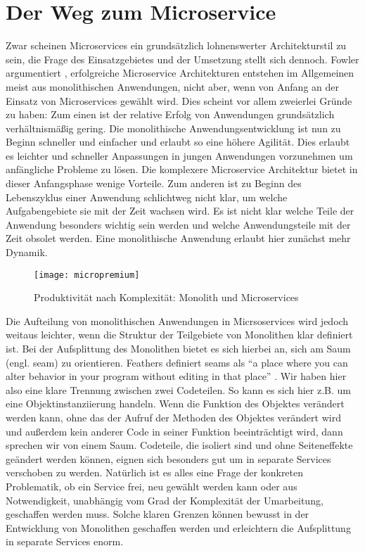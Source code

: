 \section{Der Weg zum Microservice}
Zwar scheinen Microservices ein grundsätzlich lohnenswerter Architekturstil zu sein, die Frage des Einsatzgebietes und der Umsetzung stellt sich dennoch. Fowler argumentiert \cite[][]{fowler:monolithfirst}, erfolgreiche Microservice Architekturen entstehen im Allgemeinen meist aus monolithischen Anwendungen, nicht aber, wenn von Anfang an der Einsatz von Microservices gewählt wird. Dies scheint vor allem zweierlei Gründe zu haben: Zum einen ist der relative Erfolg von Anwendungen grundsätzlich verhältnismäßig gering. Die monolithische Anwendungsentwicklung ist nun zu Beginn schneller und einfacher und erlaubt so eine höhere Agilität. Dies erlaubt es leichter und schneller Anpassungen in jungen Anwendungen vorzunehmen um anfängliche Probleme zu lösen. Die komplexere Microservice Architektur bietet in dieser Anfangsphase wenige Vorteile. Zum anderen ist zu Beginn des Lebenszyklus einer Anwendung schlichtweg nicht klar, um welche Aufgabengebiete sie mit der Zeit wachsen wird. Es ist nicht klar welche Teile der Anwendung besonders wichtig sein werden und welche Anwendungsteile mit der Zeit obsolet werden. Eine monolithische Anwendung erlaubt hier zunächst mehr Dynamik.

\begin{figure}[!ht]
    \caption{Produktivität nach Komplexität: Monolith und Microservices \cite{fowler:micropremium}}
    \centering
    \label{fig:micropremium}
    \texttt{[image: micropremium]}
\end{figure}

Die Aufteilung von monolithischen Anwendungen in Micrsoservices wird jedoch weitaus leichter, wenn die Struktur der Teilgebiete von Monolithen klar definiert ist. Bei der Aufsplittung des Monolithen bietet es sich hierbei an, sich am Saum (engl. seam) zu orientieren. Feathers definiert seams als \enquote{a place where you can alter behavior in your program without editing in that place} \cite[][Seite 29]{feathers2004working}. Wir haben hier also eine klare Trennung zwischen zwei Codeteilen. So kann es sich hier z.B. um eine Objektinstanziierung handeln. Wenn die Funktion des Objektes verändert werden kann, ohne das der Aufruf der Methoden des Objektes verändert wird und außerdem kein anderer Code in seiner Funktion beeinträchtigt wird, dann sprechen wir von einem Saum. Codeteile, die isoliert sind und ohne Seiteneffekte geändert werden können, eignen sich besonders gut um in separate Services verschoben zu werden. Natürlich ist es alles eine Frage der konkreten Problematik, ob ein Service frei, neu gewählt werden kann oder aus Notwendigkeit, unabhängig vom Grad der Komplexität der Umarbeitung, geschaffen werden muss. Solche klaren Grenzen können bewusst in der Entwicklung von Monolithen geschaffen werden und erleichtern die Aufsplittung in separate Services enorm.

